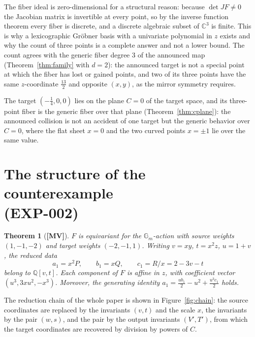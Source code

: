\documentclass[11pt]{article}
\newtheorem{theorem}{Theorem}[section]
\theoremstyle{definition}
\theoremstyle{remark}
\newcommand{\C}{\mathbb{C}}
\newcommand{\Q}{\mathbb{Q}}
\newcommand{\Gm}{\mathbb{G}_m}
\newcommand{\detJ}{\det JF}
\newcommand{\MV}{\textbf{[MV]}}
\begin{document}
The fiber ideal is zero-dimensional for a structural reason: because $\detJ \neq 0$ the Jacobian matrix is invertible at every point, so by the inverse function theorem every fiber is discrete, and a discrete algebraic subset of $\C^3$ is finite. This is why a lexicographic Gr\"obner basis with a univariate polynomial in $z$ exists and why the count of three points is a complete answer and not a lower bound. The count agrees with the generic fiber degree $3$ of the announced map (Theorem~\ref{thm:family} with $d = 2$): the announced target is not a special point at which the fiber has lost or gained points, and two of its three points have the same $z$-coordinate $\tfrac{13}{2}$ and opposite $(x,y)$, as the mirror symmetry requires.

The target $(-\tfrac14, 0, 0)$ lies on the plane $C = 0$ of the target space, and its three-point fiber is the generic fiber over that plane (Theorem~\ref{thm:cplane}): the announced collision is not an accident of one target but the generic behavior over $C = 0$, where the flat sheet $x = 0$ and the two curved points $x = \pm 1$ lie over the same value.

\section[The structure of the counterexample (EXP-002)]{The structure of the counterexample\\ (EXP-002)}\label{sec:structure}

\begin{theorem}[{\MV}]\label{thm:structure}
$F$ is equivariant for the $\Gm$-action with source weights $(1, -1, -2)$ and target weights
$(-2, -1, 1)$. Writing $v = xy$, $t = x^2 z$, $u = 1 + v$, the reduced data
\begin{equation}\label{eq:reduced}
a_1 = x^2 P, \qquad b_1 = x Q, \qquad c_1 = R / x = 2 - 3v - t
\end{equation}
belong to $\Q[v,t]$. Each component of $F$ is affine in $z$, with coefficient vector
$(u^3, 3xu^2, -x^3)$. Moreover, the generating identity
$a_1 = \tfrac{u b_1}{2} - u^2 + \tfrac{u^3 c_1}{2}$ holds.
\end{theorem}

The reduction chain of the whole paper is shown in Figure~\ref{fig:chain}: the source coordinates are replaced by the invariants $(v,t)$ and the scale $x$, the invariants by the pair $(w,s)$, and the pair by the output invariants $(V', T')$, from which the target coordinates are recovered by division by powers of $C$.
\end{document}

